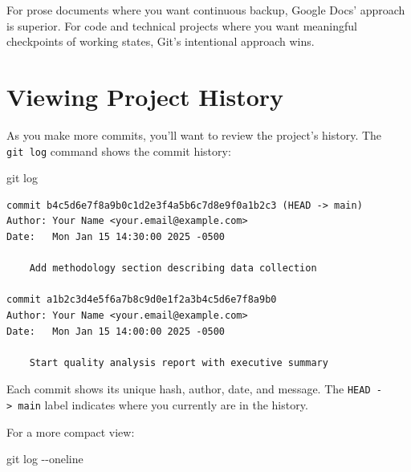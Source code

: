 \documentclass[
  letterpaper,
  DIV=11,
  numbers=noendperiod]{scrreprt}
\newenvironment{Shaded}{\begin{snugshade}}{\end{snugshade}}
\newcommand{\AttributeTok}[1]{\textcolor[rgb]{0.40,0.45,0.13}{#1}}
\newcommand{\FunctionTok}[1]{\textcolor[rgb]{0.28,0.35,0.67}{#1}}
\newcommand{\NormalTok}[1]{\textcolor[rgb]{0.00,0.23,0.31}{#1}}
\begin{document}
For prose documents where you want continuous backup, Google Docs'
approach is superior. For code and technical projects where you want
meaningful checkpoints of working states, Git's intentional approach
wins.

\section{Viewing Project History}\label{viewing-project-history}

As you make more commits, you'll want to review the project's history.
The \texttt{git\ log} command shows the commit history:

\begin{codelisting}

\caption{\texttt{terminal}}

\begin{Shaded}
\begin{Highlighting}[]
\FunctionTok{git}\NormalTok{ log}
\end{Highlighting}
\end{Shaded}

\end{codelisting}

\begin{verbatim}
commit b4c5d6e7f8a9b0c1d2e3f4a5b6c7d8e9f0a1b2c3 (HEAD -> main)
Author: Your Name <your.email@example.com>
Date:   Mon Jan 15 14:30:00 2025 -0500

    Add methodology section describing data collection

commit a1b2c3d4e5f6a7b8c9d0e1f2a3b4c5d6e7f8a9b0
Author: Your Name <your.email@example.com>
Date:   Mon Jan 15 14:00:00 2025 -0500

    Start quality analysis report with executive summary
\end{verbatim}

Each commit shows its unique hash, author, date, and message. The
\texttt{HEAD\ -\textgreater{}\ main} label indicates where you currently
are in the history.

For a more compact view:

\begin{codelisting}

\caption{\texttt{terminal}}

\begin{Shaded}
\begin{Highlighting}[]
\FunctionTok{git}\NormalTok{ log }\AttributeTok{{-}{-}oneline}
\end{Highlighting}
\end{Shaded}

\end{codelisting}
\end{document}
